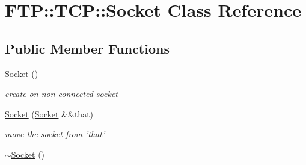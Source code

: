 \hypertarget{class_f_t_p_1_1_t_c_p_1_1_socket}{\section{F\-T\-P\-:\-:T\-C\-P\-:\-:Socket Class Reference}
\label{class_f_t_p_1_1_t_c_p_1_1_socket}
}
\subsection*{Public Member Functions}
\begin{DoxyCompactItemize}
\item 
\hypertarget{class_f_t_p_1_1_t_c_p_1_1_socket_a38968f94a259b3052b4aada84ed7bcca}{\hyperlink{class_f_t_p_1_1_t_c_p_1_1_socket_a38968f94a259b3052b4aada84ed7bcca}{Socket} ()}\label{class_f_t_p_1_1_t_c_p_1_1_socket_a38968f94a259b3052b4aada84ed7bcca}

\begin{DoxyCompactList}\small\item\em create on non connected socket \end{DoxyCompactList}\item 
\hypertarget{class_f_t_p_1_1_t_c_p_1_1_socket_a13f3818892ac508f3240ca55db98459b}{\hyperlink{class_f_t_p_1_1_t_c_p_1_1_socket_a13f3818892ac508f3240ca55db98459b}{Socket} (\hyperlink{class_f_t_p_1_1_t_c_p_1_1_socket}{Socket} \&\&that)}\label{class_f_t_p_1_1_t_c_p_1_1_socket_a13f3818892ac508f3240ca55db98459b}

\begin{DoxyCompactList}\small\item\em move the socket from 'that' \end{DoxyCompactList}\item 
\hypertarget{class_f_t_p_1_1_t_c_p_1_1_socket_a17e008f492188ab6f9114ff68b0c160b}{\hyperlink{class_f_t_p_1_1_t_c_p_1_1_socket_a17e008f492188ab6f9114ff68b0c160b}{$\sim$\-Socket} ()}\label{class_f_t_p_1_1_t_c_p_1_1_socket_a17e008f492188ab6f9114ff68b0c160b}


\end{DoxyCompactItemize}
